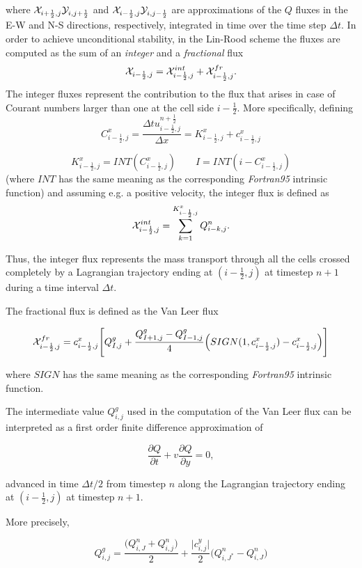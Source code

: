 where ${\cal X}_{i+\frac 12,j} {\cal Y}_{i,j+\frac 12}$ and ${\cal
X}_{i-\frac 12,j} {\cal Y}_{i,j-\frac 12}$ are approximations of the
$Q$ fluxes in the E-W and N-S directions, respectively, integrated in
time over the time step $\Delta t .$ In order to achieve unconditional
stability, in the Lin-Rood scheme the fluxes are computed as the sum
of an {\it integer } and a {\it fractional} flux $$ {\cal X}_{i-\frac
12,j}={\cal X}^{int}_{i-\frac 12,j}+{\cal X}^{fr}_{i-\frac 12,j} .$$
The integer fluxes represent the contribution to the flux that arises
in case of Courant numbers larger than one at the cell side $i-\frac
12.$ More specifically, defining $$ C^x_{i-\frac 12,j}=\frac{\Delta t
u^{n+\frac 12}_{i-\frac 12,j}}{\Delta x}= K^x_{i-\frac
12,j}+c^x_{i-\frac 12,j}
$$

$$ 
K^x_{i-\frac 12,j}=INT(C^x_{i-\frac 12,j})  \ \ \ \ \ \ \ \ \
I=INT(i - C^x_{i-\frac 12,j})
$$
(where $INT$ has the same meaning as the corresponding
{\it Fortran95} intrinsic function) 
and assuming e.g. a positive velocity, the integer flux is defined 
as $${\cal X}^{int}_{i-\frac 12,j}=\sum_{k=1}^{K^x_{i-\frac 12,j}}Q^n_{i-k,j}. $$

Thus, the integer flux represents the mass transport through all the
cells crossed completely by a Lagrangian trajectory ending at
$(i-\frac 12,j)$ at timestep $n+1$ during a time interval $\Delta t.$

The fractional flux is defined as the Van Leer flux  

\begin{equation}
{\cal X}^{fr}_{i-\frac 12,j}= 
c^x_{i-\frac 12,j}\Bigg [Q^g_{I,j} 
+\frac{ Q^g_{I+1,j}-Q^g_{I-1,j} }4    
\Big ( SIGN(1,c^x_{i-\frac 12,j}) -c^x_{i-\frac 12,j} \Big ) \Bigg ]
\label{disc2}
\end{equation}

where $SIGN$ has the same meaning as the corresponding {\it Fortran95}
intrinsic function.

The intermediate value $Q^g_{i,j}$ used in the computation of the Van
Leer flux can be interpreted as a first order finite difference
approximation of
 
$$
\frac{\partial Q}{\partial t} +v\frac{\partial Q}{\partial y}=0,
$$

advanced in time $\Delta t / 2$ from timestep $ n $ along the
Lagrangian trajectory ending at $(i-\frac 12,j)$ at timestep $ n+1.$

More precisely,

$$
Q^g_{i,j} = \frac{ \Big (  Q^n_{i,J} +Q^n_{i,j}  \Big )}2
+\frac{\vert c^y_{i,j}\vert}2  \Big ( Q^n_{i,J^*} -Q^n_{i,J} \Big )
$$

